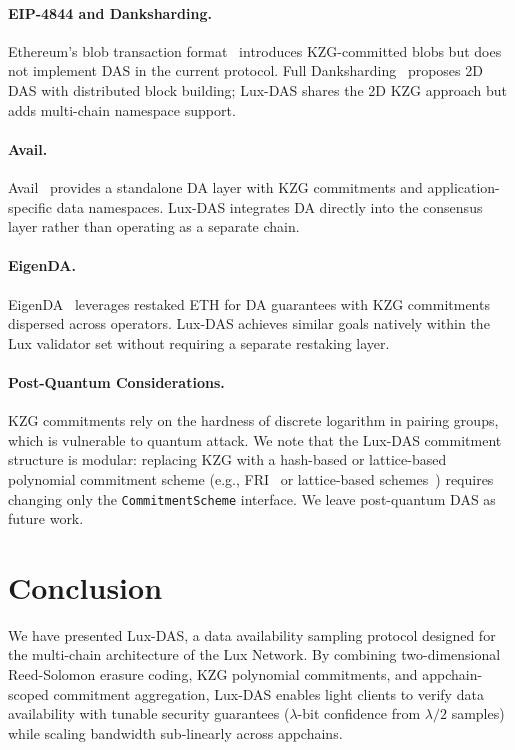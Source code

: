 \documentclass[11pt,a4paper]{article}
\theoremstyle{plain}
\theoremstyle{definition}
\theoremstyle{remark}
\begin{document}
\paragraph{EIP-4844 and Danksharding.}
Ethereum's blob transaction format~\cite{eip4844} introduces KZG-committed blobs but does
not implement DAS in the current protocol. Full Danksharding~\cite{dankrad2022danksharding}
proposes 2D DAS with distributed block building; Lux-DAS shares the 2D KZG approach but
adds multi-chain namespace support.

\paragraph{Avail.}
Avail~\cite{avail2023} provides a standalone DA layer with KZG commitments and application-
specific data namespaces. Lux-DAS integrates DA directly into the consensus layer rather
than operating as a separate chain.

\paragraph{EigenDA.}
EigenDA~\cite{eigenda2023} leverages restaked ETH for DA guarantees with KZG commitments
dispersed across operators. Lux-DAS achieves similar goals natively within the Lux validator
set without requiring a separate restaking layer.

\paragraph{Post-Quantum Considerations.}
KZG commitments rely on the hardness of discrete logarithm in pairing groups, which is
vulnerable to quantum attack. We note that the Lux-DAS commitment structure is modular:
replacing KZG with a hash-based or lattice-based polynomial commitment scheme (e.g.,
FRI~\cite{ben2018fast} or lattice-based schemes~\cite{peikert2019noninteractive}) requires
changing only the \texttt{CommitmentScheme} interface. We leave post-quantum DAS as future
work.


\section{Conclusion}
\label{sec:conclusion}

We have presented Lux-DAS, a data availability sampling protocol designed for the multi-chain
architecture of the Lux Network. By combining two-dimensional Reed-Solomon erasure coding,
KZG polynomial commitments, and appchain-scoped commitment aggregation, Lux-DAS enables light
clients to verify data availability with tunable security guarantees ($\lambda$-bit confidence
from $\lambda/2$ samples) while scaling bandwidth sub-linearly across appchains.
\end{document}
